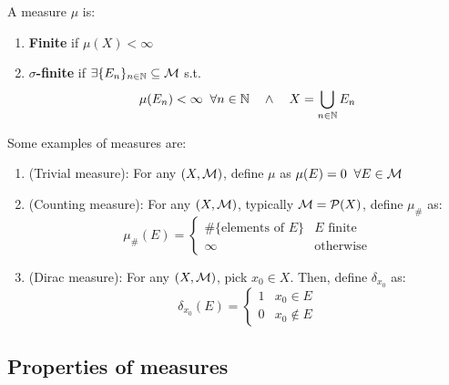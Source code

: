 \begin{fdefinition}
    A measure $\mu$ is: 
    \vspace{1em}
    \begin{enumerate}
        \item \textbf{Finite} if $\mu(X) < \infty$
        \vspace{1em}
        \item \textbf{$\sigma$-finite} if $\exists \{E_n\}_{n \in \mathbb{N}} \subseteq \mathcal{M}$ s.t. 
        $$\mu(E_n) < \infty \;\; \forall n \in \mathbb{N} \quad \wedge \quad X = \bigcup_{n \in \mathbb{N}} E_n$$
    \end{enumerate}
\end{fdefinition}

\begin{fexample}
    Some examples of measures are:
    \vspace{1em}
    \begin{enumerate}
        \item (Trivial measure): For any $(X, \mathcal{M})$, define $\mu$ as $\mu(E) = 0 \;\; \forall E \in \mathcal{M}$
        \vspace{1em}
        \item (Counting measure): For any $(X, \mathcal{M})$, typically $\mathcal{M} = \mathcal{P}(X)$, define $\mu_{\#}$ as:
        $$\mu_{\#}(E) = \begin{cases}
            \#\{\text{elements of } E\} & E \text{ finite}\\
            \infty & \text{otherwise}
        \end{cases}$$
        \vspace{1em}
        \item (Dirac measure): For any $(X, \mathcal{M})$, pick $x_0 \in X$. Then, define $\delta_{x_0}$ as:
        $$\delta_{x_0}(E) = \begin{cases}
            1 & x_0 \in E\\
            0 & x_0 \notin E
        \end{cases}$$
    \end{enumerate}
\end{fexample}

\subsection{Properties of measures}

